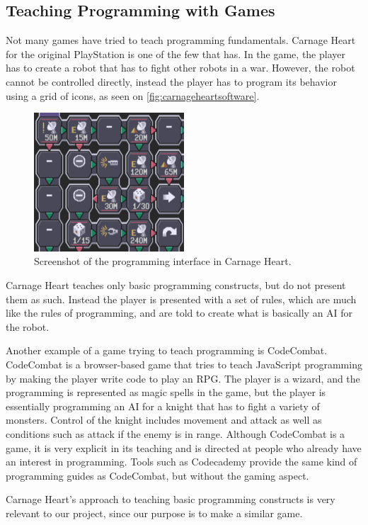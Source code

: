 \subsection{Teaching Programming with Games}
Not many games have tried to teach programming fundamentals. Carnage Heart for the original PlayStation is one of the few that has. In the game, the player has to create a robot that has to fight other robots in a war. However, the robot cannot be controlled directly, instead the player has to program its behavior using a grid of icons, as seen on \autoref{fig:carnageheartsoftware}.

\begin{figure}[hptb]
  \centering
    \includegraphics[width=0.5\textwidth]{img/CarnageHeartSoftware.png}
  \caption{Screenshot of the programming interface in Carnage Heart.\cite{carnageheartsoftware}}
  \label{fig:carnageheartsoftware}
\end{figure}

Carnage Heart teaches only basic programming constructs, but do not present them as such. Instead the player is presented with a set of rules, which are much like the rules of programming, and are told to create what is basically an AI for the robot.

Another example of a game trying to teach programming is CodeCombat. \cite{codecombat} CodeCombat is a browser-based game that tries to teach JavaScript programming by making the player write code to play an RPG. The player is a wizard, and the programming is represented as magic spells in the game, but the player is essentially programming an AI for a knight that has to fight a variety of monsters. Control of the knight includes movement and attack as well as conditions such as attack if the enemy is in range.
Although CodeCombat is a game, it is very explicit in its teaching and is directed at people who already have an interest in programming. Tools such as Codecademy provide the same kind of programming guides as CodeCombat, but without the gaming aspect.\cite{codecademy}

Carnage Heart's approach to teaching basic programming constructs is very relevant to our project, since our purpose is to make a similar game.